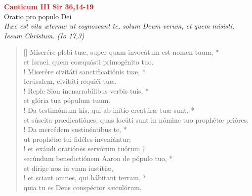 


\def\greinitialformat#1{%
{\fontsize{39}{39}\selectfont #1}%
}




\vspace{0.3cm}
\begin{center}
 \textcolor{red}{\large \bf Canticum III Sir 36,14-19}\\
Oratio pro populo Dei\\
\textit{\small Hæc est vita æterna: ut cognoscant te, solum Deum verum, et quem misisti, Iesum Christum. (Io 17,3)}
\end{center}
\begin{verse}[\versewidth]
Miserére plebi tuæ, super quam invocátum est nomen tuum, *\\
et Israel, quem coæquásti primogénito tuo.\\!
\vin Miserére civitáti sanctificatiónis tuæ, *\\
\vin Ierúsalem, civitáti requiéi tuæ.\\!
Reple Sion inenarrabílibus verbis tuis, *\\
et glória tua pópulum tuum.\\!
\vin Da testimónium his, qui ab inítio creatúræ tuæ sunt, *\\
\vin et súscita prædicatiónes, quas locúti sunt in nómine tuo prophétæ prióres.\\!
Da mercédem sustinéntibus te, *\\
ut prophétæ tui fidéles inveniántur;\\!
\vin et exáudi oratiónes servórum tuórum †\\
\vin secúndum benedictiónem Aaron de pópulo tuo, *\\
\vin et dírige nos in viam iustítiæ,\\!
et sciant omnes, qui hábitant terram, *\\
quia tu es Deus conspéctor sæculórum.\\
\end{verse}
\vspace{1cm}


